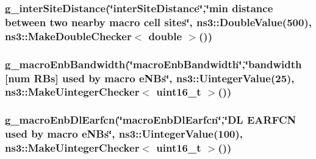\subsubsection[{\texorpdfstring{g\+\_\+inter\+Site\+Distance}{g_interSiteDistance}}]{ g\+\_\+inter\+Site\+Distance(\char`\"{}inter\+Site\+Distance\char`\"{},\char`\"{}{\bf min} distance between two nearby macro cell sites\char`\"{}, ns3\+::\+Double\+Value(500), {\bf ns3\+::\+Make\+Double\+Checker}$<$ double $>$())\hspace{0.3cm}{\ttfamily [static]}}\hypertarget{lena-dual-stripe_8cc_af3c89e09ec8aca3580170d72dda6b7cb}{}\label{lena-dual-stripe_8cc_af3c89e09ec8aca3580170d72dda6b7cb}
\subsubsection[{\texorpdfstring{g\+\_\+macro\+Enb\+Bandwidth}{g_macroEnbBandwidth}}]{ g\+\_\+macro\+Enb\+Bandwidth(\char`\"{}macro\+Enb\+Bandwidth\char`\"{},\char`\"{}bandwidth \mbox{[}num R\+Bs\mbox{]} used by macro e\+N\+Bs\char`\"{}, ns3\+::\+Uinteger\+Value(25), {\bf ns3\+::\+Make\+Uinteger\+Checker}$<$ uint16\+\_\+t $>$())\hspace{0.3cm}{\ttfamily [static]}}\hypertarget{lena-dual-stripe_8cc_a2783abc1567933836ed6b2a91b37773b}{}\label{lena-dual-stripe_8cc_a2783abc1567933836ed6b2a91b37773b}
\subsubsection[{\texorpdfstring{g\+\_\+macro\+Enb\+Dl\+Earfcn}{g_macroEnbDlEarfcn}}]{ g\+\_\+macro\+Enb\+Dl\+Earfcn(\char`\"{}macro\+Enb\+Dl\+Earfcn\char`\"{},\char`\"{}{\bf DL} {\bf E\+A\+R\+F\+CN} used by macro e\+N\+Bs\char`\"{}, ns3\+::\+Uinteger\+Value(100), {\bf ns3\+::\+Make\+Uinteger\+Checker}$<$ uint16\+\_\+t $>$())\hspace{0.3cm}{\ttfamily [static]}}\hypertarget{lena-dual-stripe_8cc_ad5eff44a4b04acd8e62dd63b404dd115}{}\label{lena-dual-stripe_8cc_ad5eff44a4b04acd8e62dd63b404dd115}
